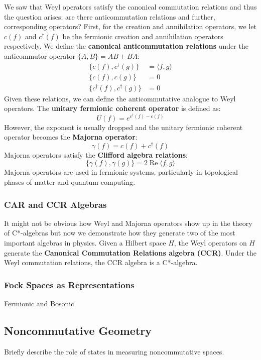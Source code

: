 \noindent We saw that Weyl operators satisfy the canonical commutation relations and thus
the question arises; are there anticommutation relations and further, corresponding
operators? First, for the creation and annihilation operators, we let $c(f)$ and $c^\dagger(f)$
be the fermionic creation and annihilation operators respectively. We define the
\textbf{canonical anticommutation relations} under the anticommutor operator $\{A,B\} = AB + BA$:
\begin{align}
    \{ c(f), c^\dagger (g)\} &= \langle f,g \rangle\\
    \{ c(f), c(g)\} &=0\\
    \{ c^\dagger(f), c^\dagger(g)\} &= 0
\end{align}
Given these relations, we can define the anticommutative analogue to Weyl operators.
The \textbf{unitary fermionic coherent operator} is defined as:
\begin{equation}
    U(f) = e^{c^\dagger(f) - c(f)}
\end{equation}
However, the exponent is usually dropped and the unitary fermionic coherent operator
becomes the \textbf{Majorna operator}:
\begin{equation}
    \gamma(f) = c(f) + c^\dagger(f)
\end{equation}
Majorna operators satisfy the \textbf{Clifford algebra relations}:
\begin{equation}
    \{ \gamma(f), \gamma(g) \} = 2 \operatorname{Re} \langle f, g \rangle
\end{equation}
Majorna operators are used in fermionic systems, particularly in topological phases
of matter and quantum computing.

\subsubsection{CAR and CCR Algebras}
It might not be obvious how Weyl and Majorna operators show up in the theory of C*-algebras
but now we demonstrate how they generate two of the most important algebras in
physics. Given a Hilbert space $H$, the Weyl operators on $H$ generate the
\textbf{Canonical Commutation Relations algebra (CCR)}. Under the Weyl commutation relations,
the CCR algebra is a C*-algebra.

\subsubsection{Fock Spaces as Representations}
Fermionic and Bosonic
\subsection{Noncommutative Geometry}
Briefly describe the role of states in measuring noncommutative spaces.